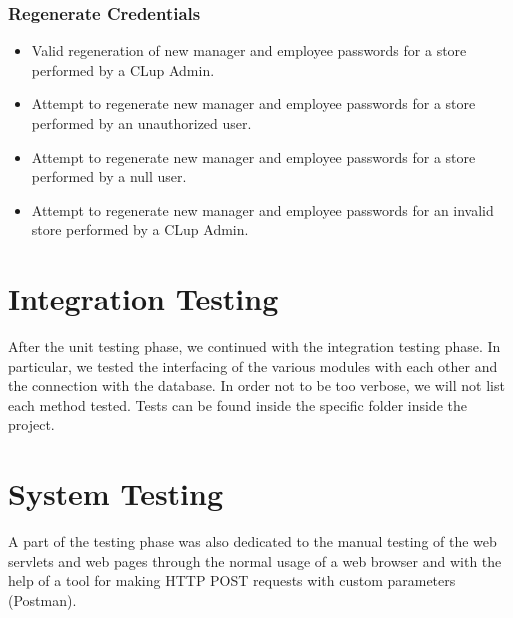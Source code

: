 \subsubsection{Regenerate Credentials}
\begin{itemize}
	\item Valid regeneration of new manager and employee passwords for a store performed by a CLup Admin.
	\item Attempt to regenerate new manager and employee passwords for a store performed by an unauthorized user.
	\item Attempt to regenerate new manager and employee passwords for a store performed by a null user.
	\item Attempt to regenerate new manager and employee passwords for an invalid store performed by a CLup Admin.
\end{itemize}

\section{Integration Testing}
After the unit testing phase, we continued with the integration testing phase. In particular, we tested the interfacing of the various modules with each other and the connection with the database.
In order not to be too verbose, we will not list each method tested. Tests can be found inside the specific folder inside the project.

\section{System Testing}
A part of the testing phase was also dedicated to the manual testing of the web servlets and web pages through the normal usage of a web browser and with the help of a tool for making HTTP POST requests with custom parameters (Postman).